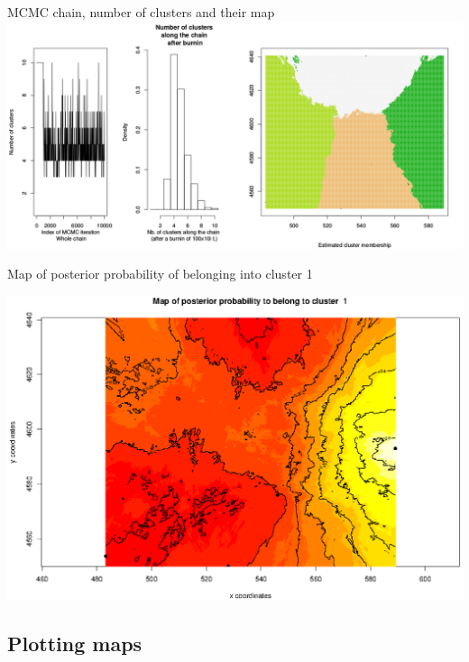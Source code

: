 \documentclass[compress, ucs, xelatex, 11pt, xcolor=svgnames,
  hyperref={
    bookmarks=true,
    unicode=true,
    colorlinks=true,
    pdftitle={Molecular data in R},
    plainpages=false,
    pdfauthor={Vojtech Zeisek},
    pdfsubject={Course about phylogeny and evolution in R},
    pdfcreator={XeLaTeX},
    pdfkeywords={R, evolution, phylogeny, molecular data},
    linkcolor=Tomato,
    anchorcolor=SaddleBrown,
    citecolor=Goldenrod,
    filecolor=DarkMagenta,
    menucolor=Sienna,
    urlcolor=DarkTurquoise,
    pdftex},
  url={hyphens, lowtilde} %
  ]{beamer}
\begin{document}
\begin{frame}{MCMC chain, number of clusters and their map}
  \includegraphics[width=\textwidth]{geneland1.png}
\end{frame}

\begin{frame}{Map of posterior probability of belonging into cluster 1}
  \begin{center}
    \includegraphics[width=\textwidth-1.5cm]{geneland2.png}
  \end{center}
\end{frame}

\subsection{Plotting maps}
\end{document}
